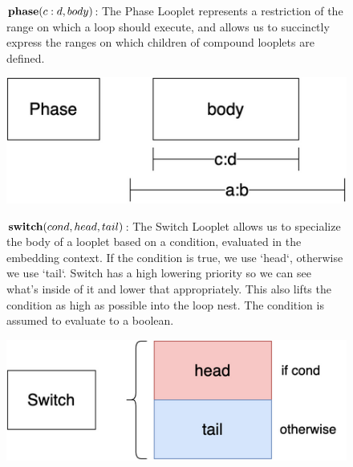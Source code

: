 \begin{figure}[ht]
    \begin{minipage}[c]{0.65\linewidth}
        $\text{\textbf{phase}}(c:d, body)$: The Phase Looplet represents a
        restriction of the range on which a loop should execute, and allows us
        to succinctly express the ranges on which children of compound looplets
        are defined.
    \end{minipage}%
    \begin{minipage}[c]{0.35\linewidth}
        \centering
        \includegraphics[scale=0.20]{Looplets-phase.png}
    \end{minipage}
    \vspace{3pt}

    \begin{minipage}[c]{0.65\linewidth}
        $\text{\textbf{switch}}(cond, head, tail)$: The Switch Looplet allows
        us to specialize the body of a looplet based on a condition, evaluated
        in the embedding context. If the condition is true, we use `head`,
        otherwise we use `tail`. Switch has a high lowering priority so we can
        see what's inside of it and lower that appropriately. This also lifts
        the condition as high as possible into the loop nest. The condition is
        assumed to evaluate to a boolean.
    \end{minipage}%
    \begin{minipage}[c]{0.35\linewidth}
        \centering
        \includegraphics[scale=0.20]{Looplets-switch.png}
    \end{minipage}
    \vspace{3pt}


\end{figure}
